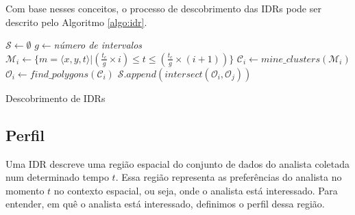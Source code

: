 Com base nesses conceitos, o processo de descobrimento das IDRs pode ser descrito pelo Algoritmo \ref{algo:idr}.

\begin{algorithm}[t]
	\DontPrintSemicolon
	$\mathcal{S} \gets \emptyset$\;
	$g \gets ${\em número de intervalos}\;
	{
		   $\mathcal{M}_i \gets \{m = \langle x,y,t \rangle | (\frac{t_c}{g} \times i) \leq t \leq (\frac{t_c}{g} \times (i+1))\}$\;
		   $\mathcal{C}_i \gets \mathit{mine\_clusters}(\mathcal{M}_i)$\label{ln:mine}\;
		   $\mathcal{O}_i \gets \mathit{find\_polygons}(\mathcal{C}_i)$\label{ln:poly}\;
	}
	{
		   $\mathcal{S}.\mathit{append}(\mathit{intersect}(\mathcal{O}_i, \mathcal{O}_j))$
	}
	\; 
	\caption{Descobrimento de IDRs}
	\label{algo:idr}
\end{algorithm}


\subsection{Perfil}

Uma IDR descreve uma região espacial do conjunto de dados do analista coletada num determinado tempo $t$. Essa região representa as preferências do analista no momento $t$ no contexto espacial, ou seja, onde o analista está interessado. Para entender, em quê o analista está interessado, definimos o perfil dessa região.

